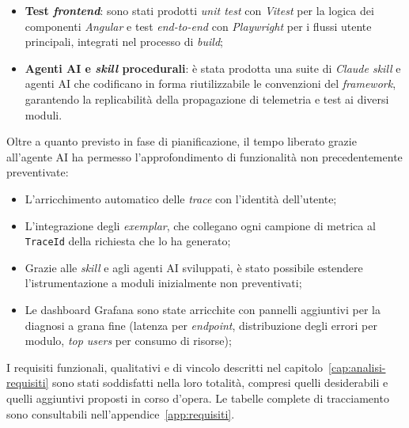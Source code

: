 \begin{itemize}
            introdotta da zero una suite comprensiva di \emph{unit test} sui
            \emph{controller}, \emph{integration test} di tipo \emph{smoke},
            \emph{lifecycle} (CRUD/Grid) e \emph{summary}; la sola messa in funzione
            della prima \emph{suite} ha portato alla luce alcuni difetti applicativi
            latenti che si sarebbero manifestati esclusivamente presso un cliente
            specifico, in produzione;
      \item \textbf{Test \emph{frontend}}: sono stati prodotti
            \emph{unit test} con \emph{Vitest} per la logica dei componenti
            \emph{Angular} e test \emph{end-to-end} con \emph{Playwright} per i
            flussi utente principali, integrati nel processo di \emph{build};
      \item \textbf{Agenti AI e \emph{skill} procedurali}: è stata
            prodotta una suite di \emph{Claude skill} e agenti AI che codificano in forma
            riutilizzabile le convenzioni del \emph{framework}, garantendo la
            replicabilità della propagazione di telemetria e test ai diversi
            moduli.
\end{itemize}
Oltre a quanto previsto in fase di pianificazione, il tempo liberato grazie
all'agente AI ha permesso l'approfondimento di funzionalità non
precedentemente preventivate:
\begin{itemize}
      \item  L'arricchimento automatico delle \emph{trace}
            con l'identità dell'utente;
      \item  L'integrazione degli \emph{exemplar}, che collegano ogni campione di metrica al
            \texttt{TraceId} della richiesta che lo ha generato;
      \item  Grazie alle \emph{skill} e agli agenti AI sviluppati, è stato possibile
            estendere l'istrumentazione a moduli inizialmente non preventivati;
      \item  Le dashboard Grafana sono state arricchite con pannelli aggiuntivi per la
            diagnosi a grana fine (latenza per \emph{endpoint}, distribuzione degli errori
            per modulo, \emph{top users} per consumo di risorse);
\end{itemize}
I requisiti funzionali, qualitativi e di vincolo descritti nel
capitolo~\ref{cap:analisi-requisiti} sono stati soddisfatti nella loro
totalità, compresi quelli desiderabili e quelli aggiuntivi proposti in corso
d'opera. Le tabelle complete di tracciamento sono consultabili
nell'appendice~\ref{app:requisiti}.
